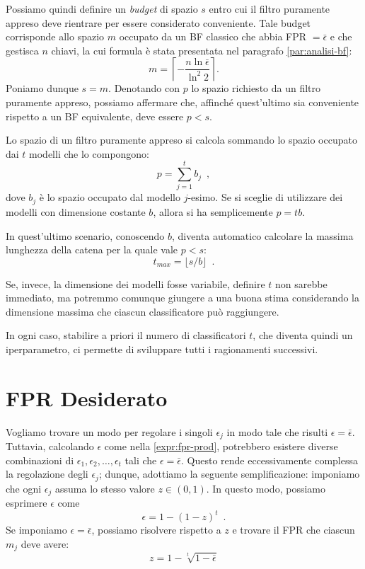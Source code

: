 Possiamo quindi definire un \textit{budget} di spazio $s$ entro cui il filtro puramente appreso deve rientrare per essere considerato conveniente. Tale budget corrisponde allo spazio $m$ occupato da un BF classico che abbia FPR $= \bar \epsilon$ e che gestisca $n$ chiavi, la cui formula è stata presentata nel paragrafo \ref{par:analisi-bf}:
\begin{equation}
    m = \left\lceil - \frac{n\ln{\bar \epsilon}}{\ln^2 2} \right\rceil .
\end{equation}
Poniamo dunque $s = m$. Denotando con $p$ lo spazio richiesto da un filtro puramente appreso, possiamo affermare che, affinché quest'ultimo sia conveniente rispetto a un BF equivalente, deve essere $p < s$.

Lo spazio di un filtro puramente appreso si calcola sommando lo spazio occupato dai $t$ modelli che lo compongono:
\begin{equation}
    p = \sum_{j=1}^t b_j \enspace ,
\end{equation}
dove $b_j$ è lo spazio occupato dal modello $j$-esimo. 
Se si sceglie di utilizzare dei modelli con dimensione costante $b$, allora si ha semplicemente $p = tb$.

In quest'ultimo scenario, conoscendo $b$, diventa automatico calcolare la massima lunghezza della catena per la quale vale $p < s$:
\begin{equation}
    t_{max} = \lfloor s/b \rfloor \enspace .
\end{equation}

Se, invece, la dimensione dei modelli fosse variabile, definire $t$ non sarebbe immediato, ma potremmo comunque giungere a una buona stima considerando la dimensione massima che ciascun classificatore può raggiungere.

In ogni caso, stabilire a priori il numero di classificatori $t$, che diventa quindi un iperparametro, ci permette di sviluppare tutti i ragionamenti successivi.

\section{FPR Desiderato}

Vogliamo trovare un modo per regolare i singoli $\epsilon_j$ in modo tale che risulti $\epsilon = \bar \epsilon$.
Tuttavia, calcolando $\epsilon$ come nella \eqref{expr:fpr-prod}, potrebbero esistere diverse combinazioni di $\epsilon_1, \epsilon_2, \dots, \epsilon_t$ tali che $\epsilon = \bar \epsilon$. Questo rende eccessivamente complessa la regolazione degli $\epsilon_j$; dunque, adottiamo la seguente semplificazione: imponiamo che ogni $\epsilon_j$ assuma lo stesso valore $z \in (0,1)$. In questo modo, possiamo esprimere $\epsilon$ come
\begin{equation}
    \epsilon = 1- (1-z)^t \enspace .
    \label{expr:fpr-z}
\end{equation}
Se imponiamo $\epsilon = \bar \epsilon$, possiamo risolvere rispetto a $z$ e trovare il FPR che ciascun $m_j$ deve avere:
\begin{equation}
    z = 1 - \sqrt[t]{1-\bar \epsilon}
    \label{expr:z}
\end{equation}

